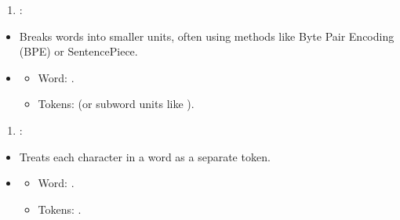 \documentclass[letterpaper,11pt,english]{sphinxmanual}
\begin{document}
\begin{itemize}
\begin{itemize}
\end{itemize}
\begin{enumerate}
%
\setcounter{enumi}{2}
\item {} 
\sphinxAtStartPar
{}:

\end{enumerate}
\begin{itemize}
\item {} 
\sphinxAtStartPar
Breaks words into smaller units, often using methods like Byte Pair Encoding (BPE) or SentencePiece.

\item {} \begin{description}
\begin{itemize}
\item {} 
\sphinxAtStartPar
Word: .

\item {} 
\sphinxAtStartPar
Tokens: \sphinxcode{\sphinxupquote{{[}"un", "happiness"{]}}} (or subword units like ).

\end{itemize}

\end{description}

\end{itemize}
\begin{enumerate}
%
\setcounter{enumi}{3}
\item {} 
\sphinxAtStartPar
{}:

\end{enumerate}
\begin{itemize}
\item {} 
\sphinxAtStartPar
Treats each character in a word as a separate token.

\item {} \begin{description}
\begin{itemize}
\item {} 
\sphinxAtStartPar
Word: .

\item {} 
\sphinxAtStartPar
Tokens: \sphinxcode{\sphinxupquote{{[}"h", "e", "l", "l", "o"{]}}}.

\end{itemize}


\end{description}
\end{itemize}
\end{itemize}
\end{document}
